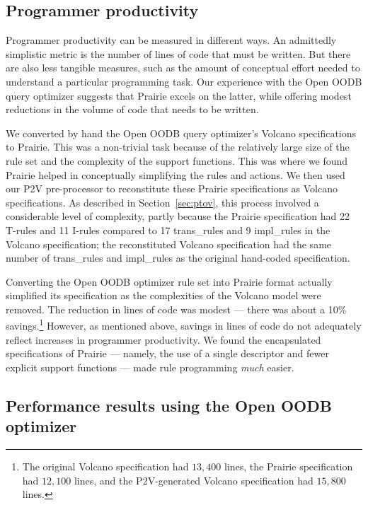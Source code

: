 \subsection{Programmer productivity}
\label{sec:productivity}

Programmer productivity can be measured in different ways.  An
admittedly simplistic metric is the number of lines of code that must
be written.  But there are also less tangible measures, such as the
amount of conceptual effort needed to understand a particular
programming task.  Our experience with the Open OODB query optimizer
suggests that Prairie excels on the latter, while offering modest
reductions in the volume of code that needs to be written.

We converted by hand the Open OODB query optimizer's Volcano
specifications to Prairie.  This was a non-trivial task because of the
relatively large size of the rule set and the complexity of the support
functions.  This was where we found Prairie helped in conceptually
simplifying the rules and actions.  We then used our P2V pre-processor
to reconstitute these Prairie specifications as Volcano
specifications.  As described in Section~\ref{sec:ptov}, this process
involved a considerable level of complexity, partly because the Prairie
specification had 22 T-rules and 11 I-rules compared to 17 trans\_rules
and 9 impl\_rules in the Volcano specification; the reconstituted
Volcano specification had the same number of trans\_rules and
impl\_rules as the original hand-coded specification.

Converting the Open OODB optimizer rule set into Prairie format
actually simplified its specification as the complexities of the
Volcano model were removed.  The reduction in lines of code was modest
--- there was about a 10\% savings.\footnote{The original Volcano
specification had $13,400$ lines, the Prairie specification had
$12,100$ lines, and the P2V-generated Volcano specification had
$15,800$ lines.} However, as mentioned above, savings in lines of code
do not adequately reflect increases in programmer productivity.  We
found the encapsulated specifications of Prairie --- namely, the use of
a single descriptor and fewer explicit support functions --- made rule
programming \emph{much} easier.

\subsection{Performance results using the Open OODB optimizer}
\label{sec:oodbexp}

